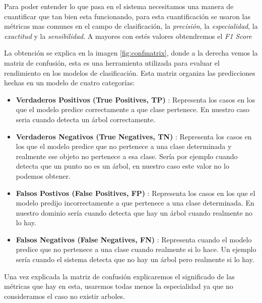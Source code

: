 Para poder entender lo que pasa en el sistema necesitamos una manera de cuantificar que tan bien esta funcionando, para esta cuantificación se usaron las métricas mas comunes en el campo de clasificación, la \textit{precisión}, la \textit{especialidad}, la \textit{exactitud} y la \textit{sensibilidad}. A mayores con estés valores obtendremos el \textit{F1 Score}

La obtención se explica en la imagen \ref{fig:confmatrix}, donde a la derecha vemos la matriz de confusión, esta es una herramienta utilizada para evaluar el rendimiento en los modelos de clasificación. Esta matriz organiza las predicciones hechas en un modelo de cuatro categorías:

\begin{itemize}
    \item \textbf{Verdaderos Positivos (True Positives, TP)} : Representa los casos en los que el modelo predice correctamente a que clase pertenece. En nuestro caso seria cuando detecta un árbol correctamente.
    \item \textbf{Verdaderos Negativos (True Negatives, TN)} :  Representa los casos en los que el modelo predice que no pertenece a una clase determinada y realmente ese objeto no pertenece a esa clase. Sería por ejemplo cuando detecta que un punto no es un árbol, en nuestro caso este valor no lo podemos obtener.
    \item \textbf{Falsos Postivos (False Positives, FP)} : Representa los casos en los que el modelo predijo incorrectamente a que pertenece a una clase determinada. En nuestro dominio sería cuando detecta que hay un árbol cuando realmente no lo hay.
    \item \textbf{Falsos Negativos (False Negatives, FN)} : Representa cuando el modelo predice que no pertenece a una clase cuando realmente si lo hace. Un ejemplo sería cuando el sistema detecta que no hay un árbol pero realmente si lo hay.
\end{itemize}

Una vez explicada la matriz de confusión explicaremos el significado de las métricas que hay en esta, usaremos todas menos la especialidad ya que no consideramos el caso no existir arboles.

